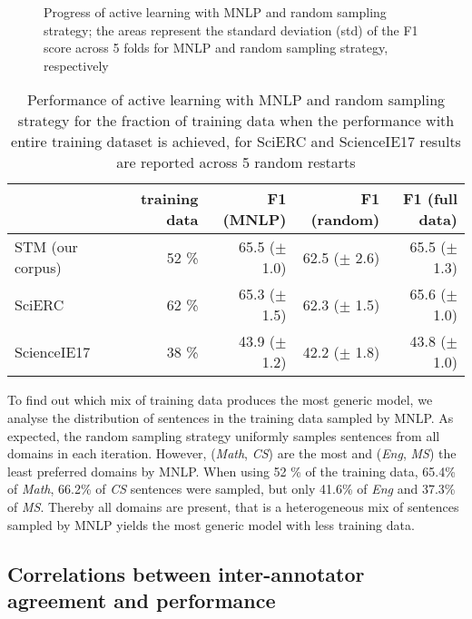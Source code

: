 \documentclass[runningheads]{llncs}
\begin{document}
\begin{figure}[htb]
    \caption{Progress of active learning with MNLP and random sampling strategy; the areas represent the standard deviation (std) of the F1 score across 5 folds for MNLP and random sampling strategy, respectively}
    \label{fig:al_sen_based}    
\end{figure}

\begin{table}[htb]
\caption{Performance of active learning with MNLP and random sampling strategy for the fraction of training data when the performance with entire training dataset is achieved, for SciERC and ScienceIE17 results are reported across 5 random restarts}
\begin{tabular}{l|rrrr}
& \multicolumn{1}{p{20mm}}{training data} & \multicolumn{1}{p{20mm}}{F1 (MNLP)}        & \multicolumn{1}{p{20mm}}{F1 (random)}        & \multicolumn{1}{p{20mm}}{F1 (full data)}    \\ \hline
STM (our corpus)         & 52 \%                    & 65.5 ($\pm$ 1.0) & 62.5 ($\pm$ 2.6) & 65.5 ($\pm$ 1.3) \\
SciERC~\cite{Luan2018MultiTaskIO}      & 62 \%                   & 65.3 ($\pm$ 1.5) & 62.3 ($\pm$ 1.5) & 65.6 ($\pm$ 1.0) \\
ScienceIE17~\cite{augenstein2017semeval} & 38 \%                   & 43.9 ($\pm$ 1.2) & 42.2 ($\pm$ 1.8) & 43.8 ($\pm$ 1.0)
\end{tabular}
\label{table:al_results}
\end{table}


To find out which mix of training data produces the most generic model, we analyse the distribution of sentences in the training data sampled by MNLP. 
As expected, the random sampling strategy uniformly samples sentences from all domains in each iteration.
However, (\textit{Math}, \textit{CS}) are the most and (\textit{Eng}, \textit{MS}) the least preferred domains by MNLP. 
When using 52 \% of the training data, 65.4\% of \textit{Math}, 66.2\% of \textit{CS} sentences were sampled, but only 41.6\% of \textit{Eng} and 37.3\% of \textit{MS}. Thereby all domains are present, that is a heterogeneous mix of sentences sampled by MNLP yields the most generic model with less training data.



\subsection{Correlations between inter-annotator agreement and performance}
\end{document}
